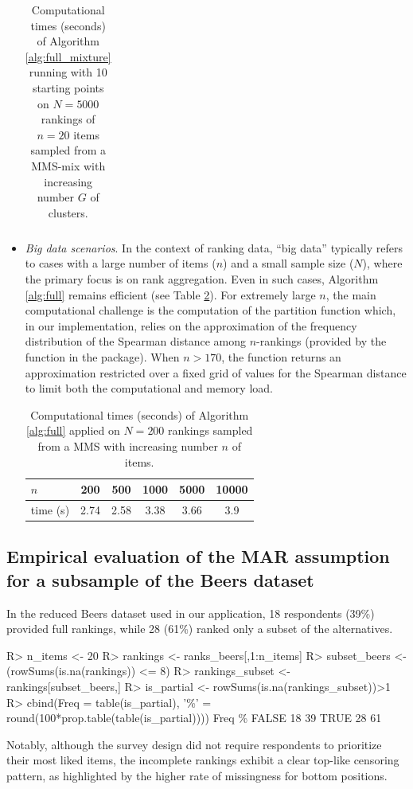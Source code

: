 \begin{itemize}
\begin{table}[h]
\begin{tabular}{|l|c|c|c|c|c|}
\end{tabular}
\caption{ Computational times (seconds) of Algorithm \ref{alg:full_mixture} running with 10 starting points on $N=5000$ rankings of $n=20$ items sampled from a MMS-mix with increasing number $G$ of clusters.}
\label{largeG}
\end{table}
\item \textit{Big data scenarios}. In the context of ranking data, ``big data'' typically refers to cases with a large number of items ($n$) and a small sample size ($N$), where the primary focus is on rank aggregation. Even in such cases, Algorithm \ref{alg:full} remains efficient (see Table \ref{bigdata}).
For extremely large $n$, the main computational challenge is the computation of the partition function which, in our implementation, relies on  the approximation of the frequency distribution of the Spearman distance among $n$-rankings (provided by the  function in the package). When $n>170$, the function returns an approximation restricted over a fixed grid of values for the Spearman distance to limit both the computational and memory load.
\begin{table}[h!]
\centering
\begin{tabular}{|l|c|c|c|c|c|}
\hline
$n$        & 200  & 500  & 1000 & 5000 & 10000 \\ \hline
time (s) & 2.74 & 2.58 & 3.38 & 3.66 & 3.9   \\ \hline
\end{tabular}
\caption{ Computational times (seconds) of Algorithm \ref{alg:full} applied on $N=200$ rankings sampled from a MMS with increasing number $n$ of items.}
\label{bigdata}
\end{table}
\end{itemize}

\subsection{Empirical evaluation of the MAR assumption for a subsample of the Beers dataset}
\label{app:censoring_beers}

In the reduced Beers dataset used in our application, 18 respondents (39\%) provided full rankings, while 28 (61\%) ranked only a subset of the alternatives.
%
\begin{example*}
R> n\_items <- 20
R> rankings <- ranks\_beers[,1:n\_items]
R> subset\_beers <- (rowSums(is.na(rankings)) <= 8)
R> rankings\_subset <- rankings[subset\_beers,]
R> is\_partial <- rowSums(is.na(rankings\_subset))>1
R> cbind(Freq = table(is\_partial), '\%' = round(100*prop.table(table(is\_partial))))
     Freq  \%
FALSE   18 39
TRUE    28 61
\end{example*}
%
Notably, although the survey design did not require respondents to prioritize their most liked items, the incomplete rankings exhibit a clear top-like censoring pattern, as highlighted by the higher rate of missingness for bottom positions.


